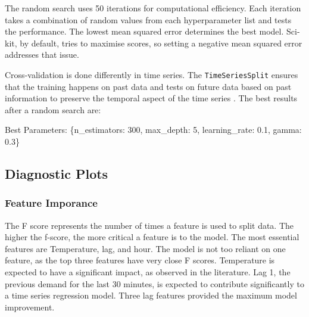 \documentclass[mstat,12pt]{unswthesis}
\newenvironment{Shaded}{\begin{snugshade}}{\end{snugshade}}
\newcommand{\DecValTok}[1]{\textcolor[rgb]{0.00,0.00,0.81}{#1}}
\newcommand{\FloatTok}[1]{\textcolor[rgb]{0.00,0.00,0.81}{#1}}
\newcommand{\NormalTok}[1]{#1}
\newcommand{\StringTok}[1]{\textcolor[rgb]{0.31,0.60,0.02}{#1}}
\begin{document}
The random search uses 50 iterations for computational efficiency. Each
iteration takes a combination of random values from each hyperparameter
list and tests the performance. The lowest mean squared error determines
the best model. Sci-kit, by default, tries to maximise scores, so
setting a negative mean squared error addresses that issue.

Cross-validation is done differently in time series. The
\texttt{TimeSeriesSplit} ensures that the training happens on past data
and tests on future data based on past information to preserve the
temporal aspect of the time series \cite{scikit-learn2024}. The best
results after a random search are:

\begin{Shaded}
\begin{Highlighting}[]
\NormalTok{Best Parameters: \{}\StringTok{\textquotesingle{}n\_estimators\textquotesingle{}}\NormalTok{: }\DecValTok{300}\NormalTok{, }
                  \StringTok{\textquotesingle{}max\_depth\textquotesingle{}}\NormalTok{: }\DecValTok{5}\NormalTok{, }
                  \StringTok{\textquotesingle{}learning\_rate\textquotesingle{}}\NormalTok{: }\FloatTok{0.1}\NormalTok{, }
                  \StringTok{\textquotesingle{}gamma\textquotesingle{}}\NormalTok{: }\FloatTok{0.3}\NormalTok{\}}
\end{Highlighting}
\end{Shaded}

\subsection{Diagnostic Plots}\label{diagnostic-plots}

\subsubsection{Feature Imporance}\label{feature-imporance}

The F score represents the number of times a feature is used to split
data. The higher the f-score, the more critical a feature is to the
model. The most essential features are Temperature, lag, and hour. The
model is not too reliant on one feature, as the top three features have
very close F scores. Temperature is expected to have a significant
impact, as observed in the literature. Lag 1, the previous demand for
the last 30 minutes, is expected to contribute significantly to a time
series regression model. Three lag features provided the maximum model
improvement.
\end{document}
